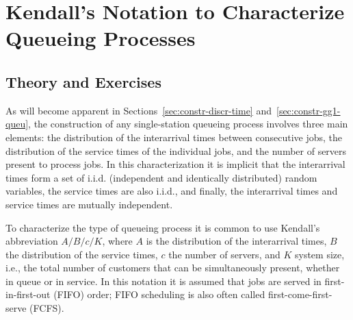 
\section{Kendall's Notation to Characterize Queueing Processes}
\label{sec:kendalls-notation}

\subsection*{Theory and Exercises}

As will become apparent in Sections~\ref{sec:constr-discr-time}
and~\ref{sec:constr-gg1-queu}, the construction of any single-station queueing
process involves three main elements: 
the distribution of the
interarrival times between consecutive jobs, the distribution of the
service times of the individual jobs, and the number of servers
present to process jobs. In this characterization it is implicit that
the interarrival times form a set of i.i.d. (independent and
identically distributed) random variables, the service times are also
i.i.d., and finally, the interarrival times and service times are
mutually independent.

To characterize the type of queueing process it is common to use 
Kendall's abbreviation $A/B/c/K$, where $A$ is the distribution of the
interarrival times, $B$ the distribution of the service times, $c$ the
number of servers, and $K$ system size, i.e., the total number of customers that can be simultaneously present, whether in queue or in service. In this notation it
is assumed that jobs are served in first-in-first-out (FIFO) order;
FIFO scheduling is also often called first-come-first-serve (FCFS).

